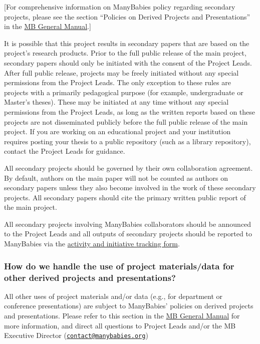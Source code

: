 \documentclass[
  letterpaper,
  DIV=11,
  numbers=noendperiod,
  oneside]{scrreprt}
\begin{document}
{[}For comprehensive information on ManyBabies policy regarding
secondary projects, please see the section ``Policies on Derived
Projects and Presentations'' in the
\href{https://docs.google.com/document/d/1dZ3sF2UcxvpkfOfKSKFeObTMZRbpUYloMUiPYtZy0ng/edit\#heading=h.wxrfm5m3ma0l}{MB
General Manual}.{]}

It is possible that this project results in secondary papers that are
based on the project's research products. Prior to the full public
release of the main project, secondary papers should only be initiated
with the consent of the Project Leads. After full public release,
projects may be freely initiated without any special permissions from
the Project Leads. The only exception to these rules are projects with a
primarily pedagogical purpose (for example, undergraduate or Master's
theses). These may be initiated at any time without any special
permissions from the Project Leads, as long as the written reports based
on these projects are not disseminated publicly before the full public
release of the main project. If you are working on an educational
project and your institution requires posting your thesis to a public
repository (such as a library repository), contact the Project Leads for
guidance.

All secondary projects should be governed by their own collaboration
agreement. By default, authors on the main paper will not be counted as
authors on secondary papers unless they also become involved in the work
of these secondary projects. All secondary papers should cite the
primary written public report of the main project.

All secondary projects involving ManyBabies collaborators should be
announced to the Project Leads and all outputs of secondary projects
should be reported to ManyBabies via the
\href{https://docs.google.com/forms/d/e/1FAIpQLSd_3MDyUaDY4xKELqd4-Ugkz1r3kigbJdg8yTPQieFsG58bJw/viewform}{activity
and initiative tracking form}.

\subsubsection{How do we handle the use of project materials/data for
other derived projects and
presentations?}\label{how-do-we-handle-the-use-of-project-materialsdata-for-other-derived-projects-and-presentations}

All other uses of project materials and/or data (e.g., for department or
conference presentations) are subject to ManyBabies' policies on derived
projects and presentations. Please refer to this section in the
\href{https://docs.google.com/document/d/1dZ3sF2UcxvpkfOfKSKFeObTMZRbpUYloMUiPYtZy0ng/edit\#heading=h.wxrfm5m3ma0l}{MB
General Manual} for more information, and direct all questions to
Project Leads and/or the MB Executive Director
(\href{mailto:contact@manybabies.org}{\nolinkurl{contact@manybabies.org}})
\end{document}
